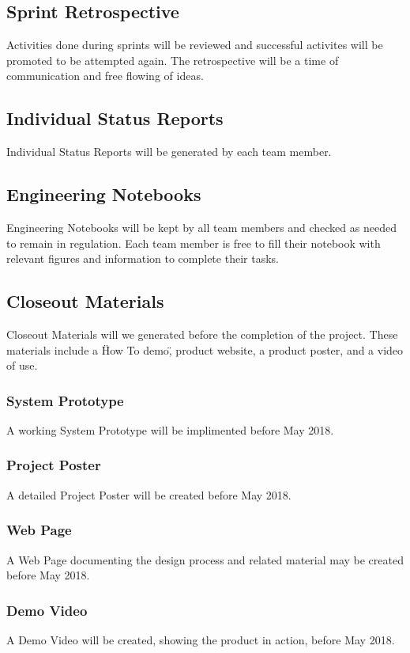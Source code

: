 \subsection{Sprint Retrospective}
\quad \quad Activities done during sprints will be reviewed and successful activites will be 
promoted to be attempted again. The retrospective will be a time of communication 
and free flowing of ideas.

\subsection{Individual Status Reports}
\quad \quad Individual Status Reports will be generated by each team member.

\subsection{Engineering Notebooks}
\quad \quad Engineering Notebooks will be kept by all team members and checked as needed to 
remain in regulation. Each team member is free to fill their notebook with relevant 
figures and information to complete their tasks.

\subsection{Closeout Materials}
\quad \quad Closeout Materials will we generated before the completion of the project. These 
materials include a \"How To demo\", product website, a product poster, and a video 
of use.

\subsubsection{System Prototype}
\quad \quad A working System Prototype will be implimented before May 2018.

\subsubsection{Project Poster}
\quad \quad A detailed Project Poster will be created before May 2018.

\subsubsection{Web Page}
\quad \quad A Web Page documenting the design process and related material may be created before 
May 2018.

\subsubsection{Demo Video}
\quad \quad A Demo Video will be created, showing the product in action, before May 2018.

